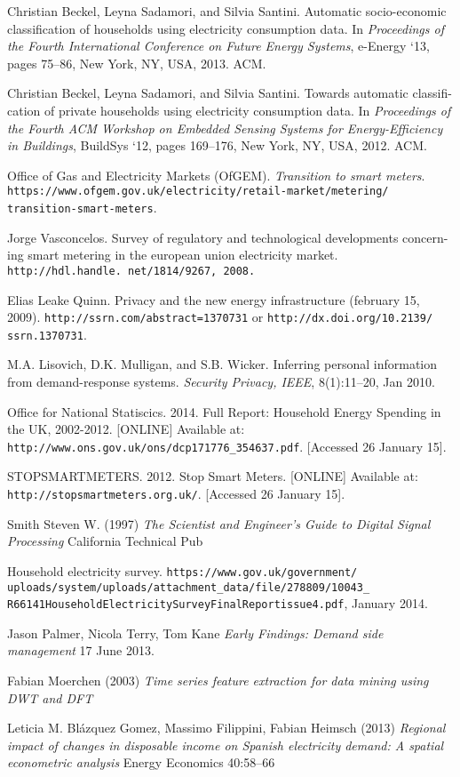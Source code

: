 \documentclass[12pt,a4paper]{report}
\begin{document}
\begin{thebibliography}{9}

 Christian Beckel, Leyna Sadamori, and Silvia Santini. Automatic socio-economic classification of households using electricity consumption data. In {\em Proceedings of the Fourth International Conference on Future Energy Systems}, e-Energy `13, pages 75–86, New York, NY, USA, 2013. ACM.

 Christian Beckel, Leyna Sadamori, and Silvia Santini. Towards automatic classifi- cation of private households using electricity consumption data. In {\em Proceedings of the Fourth ACM Workshop on Embedded Sensing Systems for Energy-Efficiency in Buildings}, BuildSys `12, pages 169–176, New York, NY, USA, 2012. ACM.

 Office of Gas and Electricity Markets (OfGEM). {\em Transition to smart meters}. {\tt https://www.ofgem.gov.uk/electricity/retail-market/metering/ transition-smart-meters}.

 Jorge Vasconcelos. Survey of regulatory and technological developments concern- ing smart metering in the european union electricity market. {\tt http://hdl.handle. net/1814/9267, 2008.}

 Elias Leake Quinn. Privacy and the new energy infrastructure (february 15, 2009). \texttt{http://ssrn.com/abstract=1370731} or \texttt{http://dx.doi.org/10.2139/ ssrn.1370731}.

 M.A. Lisovich, D.K. Mulligan, and S.B. Wicker. Inferring personal information from demand-response systems. \textit{Security Privacy, IEEE}, 8(1):11–20, Jan 2010.

 Office for National Statiscics. 2014. Full Report: Household Energy Spending in the UK, 2002-2012. [ONLINE] Available at: \texttt{http://www.ons.gov.uk/ons/dcp171776\_354637.pdf}. [Accessed 26 January 15].

STOPSMARTMETERS. 2012. Stop Smart Meters. [ONLINE] Available at: \texttt{http://stopsmartmeters.org.uk/}. [Accessed 26 January 15].

 Smith Steven W. (1997) \textit{The Scientist and Engineer's Guide to Digital Signal Processing} California Technical Pub

Household electricity survey. \texttt{https://www.gov.uk/government/ uploads/system/uploads/attachment\_data/file/278809/10043\_ R66141HouseholdElectricitySurveyFinalReportissue4.pdf}, January 2014.

Jason Palmer, Nicola Terry, Tom Kane \textit{Early Findings: Demand side management} 17 June 2013.

 Fabian Moerchen (2003) \textit{Time series feature extraction for data mining using DWT and DFT}

 Leticia M. Blázquez Gomez, Massimo Filippini, Fabian Heimsch (2013) \textit{Regional impact of changes in disposable income on Spanish electricity demand: A spatial econometric analysis} Energy Economics 40:58–66

\end{thebibliography}
\end{document}
